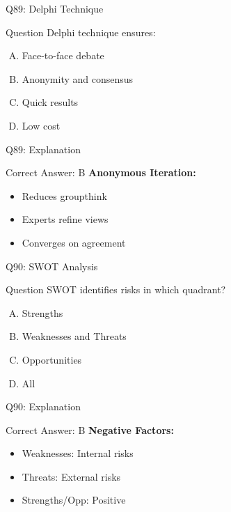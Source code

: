 \documentclass{beamer}
\begin{document}
			\begin{frame}{Q89: Delphi Technique}
				\begin{block}{Question}
					Delphi technique ensures:
				\end{block}
				\begin{enumerate}[(A)]
					\item Face-to-face debate
					\item Anonymity and consensus
					\item Quick results
					\item Low cost
				\end{enumerate}
			\end{frame}
			\begin{frame}{Q89: Explanation}
				\begin{block}{Correct Answer: B}
					\textbf{Anonymous Iteration:}
					\begin{itemize}
						\item Reduces groupthink
						\item Experts refine views
						\item Converges on agreement
					\end{itemize}
				\end{block}
			\end{frame}
			
			\begin{frame}{Q90: SWOT Analysis}
				\begin{block}{Question}
					SWOT identifies risks in which quadrant?
				\end{block}
				\begin{enumerate}[(A)]
					\item Strengths
					\item Weaknesses and Threats
					\item Opportunities
					\item All
				\end{enumerate}
			\end{frame}
			\begin{frame}{Q90: Explanation}
				\begin{block}{Correct Answer: B}
					\textbf{Negative Factors:}
					\begin{itemize}
						\item Weaknesses: Internal risks
						\item Threats: External risks
						\item Strengths/Opp: Positive
					\end{itemize}
				\end{block}
			\end{frame}
			
\end{document}
